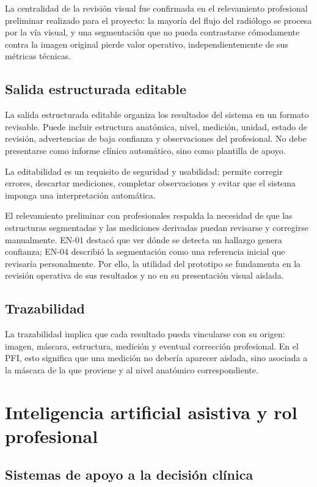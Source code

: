La centralidad de la revisión visual fue confirmada en el relevamiento profesional preliminar realizado para el proyecto: la mayoría del flujo del radiólogo se procesa por la vía visual, y una segmentación que no pueda contrastarse cómodamente contra la imagen original pierde valor operativo, independientemente de sus métricas técnicas.

\subsection{Salida estructurada editable}

La salida estructurada editable organiza los resultados del sistema en un formato revisable. Puede incluir estructura anatómica, nivel, medición, unidad, estado de revisión, advertencias de baja confianza y observaciones del profesional. No debe presentarse como informe clínico automático, sino como plantilla de apoyo.

La editabilidad es un requisito de seguridad y usabilidad: permite corregir errores, descartar mediciones, completar observaciones y evitar que el sistema imponga una interpretación automática.

El relevamiento preliminar con profesionales respalda la necesidad de que las estructuras segmentadas y las mediciones derivadas puedan revisarse y corregirse manualmente. EN-01 destacó que ver dónde se detecta un hallazgo genera confianza; EN-04 describió la segmentación como una referencia inicial que revisaría personalmente. Por ello, la utilidad del prototipo se fundamenta en la revisión operativa de sus resultados y no en su presentación visual aislada.

\subsection{Trazabilidad}

La trazabilidad implica que cada resultado pueda vincularse con su origen: imagen, máscara, estructura, medición y eventual corrección profesional. En el PFI, esto significa que una medición no debería aparecer aislada, sino asociada a la máscara de la que proviene y al nivel anatómico correspondiente.

\section{Inteligencia artificial asistiva y rol profesional}

\subsection{Sistemas de apoyo a la decisión clínica}

